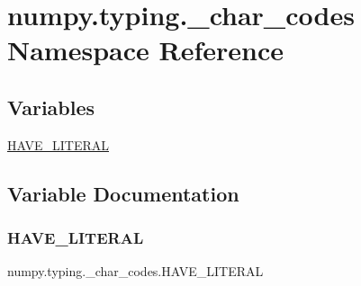 \hypertarget{namespacenumpy_1_1typing_1_1__char__codes}{}\section{numpy.\+typing.\+\_\+char\+\_\+codes Namespace Reference}
\label{namespacenumpy_1_1typing_1_1__char__codes}
\subsection*{Variables}
\begin{DoxyCompactItemize}
\item 
\hyperlink{namespacenumpy_1_1typing_1_1__char__codes_a6c60eab909db105e8c34cc48628ced4f}{H\+A\+V\+E\+\_\+\+L\+I\+T\+E\+R\+AL}
\end{DoxyCompactItemize}


\subsection{Variable Documentation}
\mbox{\label{namespacenumpy_1_1typing_1_1__char__codes_a6c60eab909db105e8c34cc48628ced4f}} 
\subsubsection{\texorpdfstring{H\+A\+V\+E\+\_\+\+L\+I\+T\+E\+R\+AL}{HAVE\_LITERAL}}
{\footnotesize\ttfamily numpy.\+typing.\+\_\+char\+\_\+codes.\+H\+A\+V\+E\+\_\+\+L\+I\+T\+E\+R\+AL}

